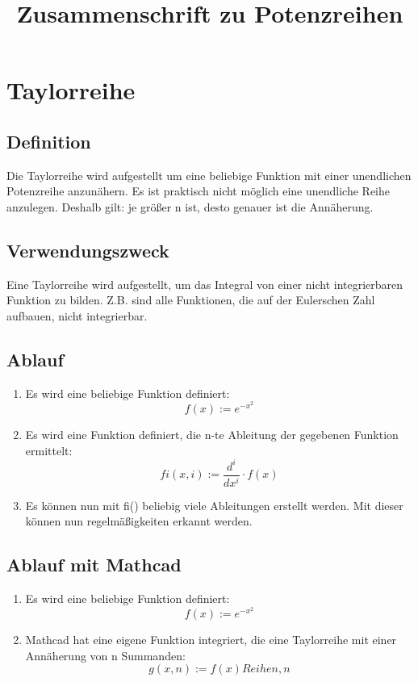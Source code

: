 \documentclass[a4paper,10pt]{article}
\title{Zusammenschrift zu Potenzreihen}
\begin{document}
\maketitle
\thispagestyle{fancy}

\section{Taylorreihe}
\subsection{Definition}
Die Taylorreihe wird aufgestellt um eine beliebige Funktion mit einer
unendlichen Potenzreihe anzunähern. Es ist praktisch nicht möglich
eine unendliche Reihe anzulegen. Deshalb gilt: je größer n ist, desto
genauer ist die Annäherung.

\subsection{Verwendungszweck}
Eine Taylorreihe wird aufgestellt, um das Integral von einer nicht
integrierbaren Funktion zu bilden. Z.B. sind alle Funktionen, die auf
der Eulerschen Zahl aufbauen, nicht integrierbar.

\subsection{Ablauf}
\begin{enumerate}
\item { Es wird eine beliebige Funktion definiert:
    \begin{equation}
      \label{eq:1}
      f(x) := e^{-x^2}
    \end{equation}
  }
\item { Es wird eine Funktion definiert, die n-te Ableitung der
    gegebenen Funktion ermittelt:
    \begin{equation}
      \label{eq:3}
      fi(x,i) := \frac{d^i}{dx^i} \cdot f(x)
    \end{equation}
  }
\item { Es können nun mit fi() beliebig viele Ableitungen erstellt
    werden. Mit dieser können nun regelmäßigkeiten erkannt werden.
  }
\end{enumerate}

\subsection{Ablauf mit Mathcad}
\begin{enumerate}
\item { Es wird eine beliebige Funktion definiert:
    \begin{equation}
      \label{eq:1}
      f(x) := e^{-x^2}
    \end{equation}
  }
\item { Mathcad hat eine eigene Funktion integriert, die eine
    Taylorreihe mit einer Annäherung von n Summanden:
    \begin{equation}
      \label{eq:2}
      g(x, n) := f(x) Reihen, n
    \end{equation}
  }
\end{enumerate}
\end{document}
